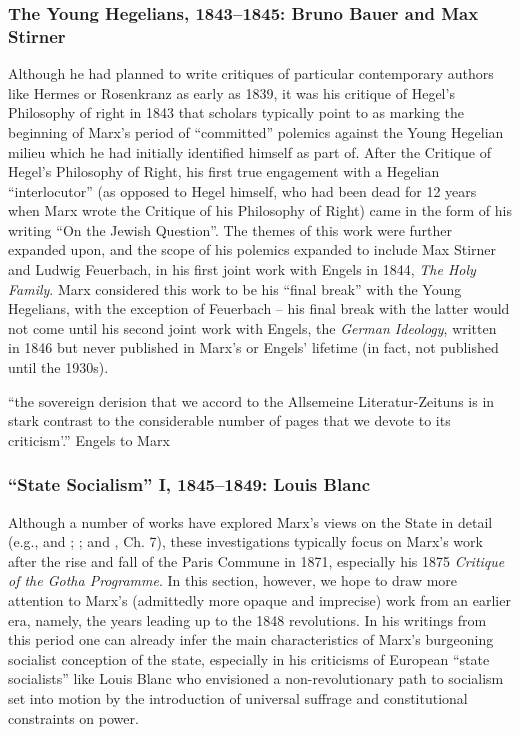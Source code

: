 \subsubsection{The Young Hegelians, 1843--1845: Bruno Bauer and Max Stirner\label{sec:hegelians}}

Although he had planned to write critiques of particular contemporary authors like Hermes or Rosenkranz as early as 1839, it was his critique of Hegel's Philosophy of right in 1843 that scholars typically point to as marking the beginning of Marx's period of ``committed'' polemics against the Young Hegelian milieu which he had initially identified himself as part of. After the Critique of Hegel's Philosophy of Right, his first true engagement with a Hegelian ``interlocutor'' (as opposed to Hegel himself, who had been dead for 12 years when Marx wrote the Critique of his Philosophy of Right) came in the form of his writing ``On the Jewish Question''. The themes of this work were further expanded upon, and the scope of his polemics expanded to include Max Stirner and Ludwig Feuerbach, in his first joint work with Engels in 1844, \textit{The Holy Family}. Marx considered this work to be his ``final break'' with the Young Hegelians, with the exception of Feuerbach -- his final break with the latter would not come until his second joint work with Engels, the \textit{German Ideology}, written in 1846 but never published in Marx's or Engels' lifetime (in fact, not published until the 1930s).

``the sovereign
derision that we accord to the Allsemeine Literatur-Zeituns is in stark
contrast to the considerable number of pages that we devote to its
criticism'.'' Engels to Marx

\subsubsection{``State Socialism'' I, 1845--1849: Louis Blanc\label{sec:blanc}}

Although a number of works have explored Marx's views on the State in detail (e.g., \cite{hunt_political_1974} and \cite{hunt_political_1984}; \cite{draper_karl_1977-1}; and \cite{leipold_radical_2020}, Ch. 7), these investigations typically focus on Marx's work after the rise and fall of the Paris Commune in 1871, especially his 1875 \textit{Critique of the Gotha Programme}. In this section, however, we hope to draw more attention to Marx's (admittedly more opaque and imprecise) work from an earlier era, namely, the years leading up to the 1848 revolutions. In his writings from this period one can already infer the main characteristics of Marx's burgeoning socialist conception of the state, especially in his criticisms of European ``state socialists'' like Louis Blanc who envisioned a non-revolutionary path to socialism set into motion by the introduction of universal suffrage and constitutional constraints on power.

